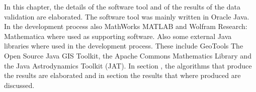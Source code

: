 In this chapter, the details of the software tool and of the results of the data validation are elaborated. The software tool was mainly written in Oracle Java. In the development process also MathWorks MATLAB and Wolfram Research: Mathematica where used as supporting software. Also some external Java libraries where used in the development process. These include GeoTools The Open Source Java GIS Toolkit, the Apache Commons Mathematics Library and the Java Astrodynamics Toolkit (JAT). In section \pageref{SoftwareToolInternals}, the algorithms that produce the results are elaborated and in section \pageref{sec:ValidationResults} the results that where produced are discussed.
